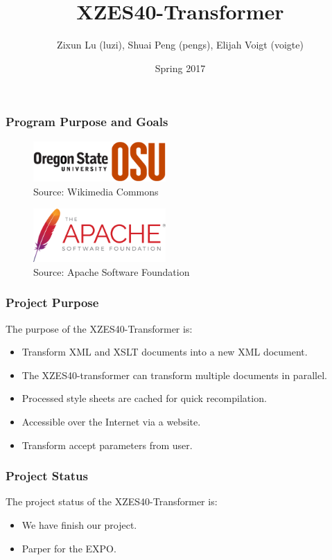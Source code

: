 \documentclass{beamer}
\title{XZES40-Transformer}
\author{Zixun Lu (luzi),
  Shuai Peng (pengs),
  Elijah Voigt (voigte)}
\institute{CS 462 | CS Senior Capstone | Group \#40}
\date{Spring 2017}
\begin{document}
 
\frame{\titlepage}

\begin{frame}
  \frametitle{Program Purpose and Goals }
\begin{figure}
  \centering
    \includegraphics[width=0.45\textwidth]{figures/osu-logo}
    \caption{Source: Wikimedia Commons \cite{osu-logo}}
\end{figure}

\begin{figure}
  \centering
    \includegraphics[width=0.45\textwidth]{figures/asf-logo}
    \caption{Source: Apache Software Foundation \cite{asf-logo}}
\end{figure}
\end{frame}

\begin{frame}
  \frametitle{Project Purpose}
  The purpose of the XZES40-Transformer is:
  \begin{itemize}
  \item Transform XML and XSLT documents into a new XML document.
  \item The XZES40-transformer can transform multiple documents in parallel. 
  \item Processed style sheets are cached for quick recompilation.
  \item Accessible over the Internet via a website.
  \item Transform accept parameters from user.
  \end{itemize}
\end{frame}

\begin{frame}
  \frametitle{Project Status}
  The project status of the XZES40-Transformer is:
  \begin{itemize}
  	\item We have finish our project.
  	\item Parper for the EXPO.
  \end{itemize}
\end{frame}
\end{document}
